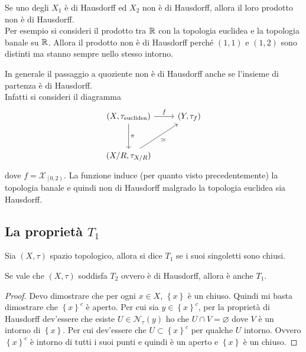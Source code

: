 \begin{remark}
Se uno degli $X_1$ è di Hausdorff ed $X_2$ non è di Hausdorff, allora il loro prodotto non è di Hausdorff. \\ Per esempio si consideri il prodotto tra $\mathbb{R}$ con la topologia euclidea e la topologia banale su $\mathbb{R}$. Allora il prodotto non è di Hausdorff perché $(1,1)$ e $(1,2)$ sono distinti ma stanno sempre nello stesso intorno. 
	
\end{remark} 


\begin{remark}
	In generale il passaggio a quoziente non è di Hausdorff anche se l'insieme di partenza è di Hausdorff. \\ Infatti si consideri il diagramma 
	\begin{equation*}
	\begin{tikzcd}[row sep = 3em]
	 (X, \tau_{\text{euclidea}}) \arrow{d}{\pi}\arrow{r}{f} & (Y, \tau_f)\\
	(X/R,\tau_{X/R}) \arrow[swap]{ru}{\simeq} &
	\end{tikzcd}
	\end{equation*}
	dove $f = \mathcal{X}_{\left[0,2\right)}$. La funzione induce (per quanto visto precedentemente) la topologia banale e quindi non di Hausdorff malgrado la topologia euclidea sia Hausdorff. 
\end{remark} 



\subsection{\textcolor{TopGener}{\textbf{La proprietà $T_1$}}}



\begin{definition}
	Sia $(X, \tau)$ spazio topologico, allora si dice \textbf{$T_1$} se i suoi singoletti sono chiusi. 
\end{definition}

\begin{theorem}
	Se vale che $(X, \tau)$ soddisfa $T_2$ ovvero è di Hausdorff, allora è anche $T_1$.
\end{theorem} 
\begin{proof}
	Devo dimostrare che per ogni $x\in X$, $\left\{x\right\}$ è un chiuso. Quindi mi basta dimostrare che $\left\{x\right\}^c$ è aperto. Per cui sia $y \in \left\{x\right\}^c$, per la proprietà di Hausdorff dev'essere che esiste $U \in \mathcal{N}_\tau(y)$ ho che $U \cap V = \varnothing$ dove $V$ è un intorno di $\left\{x\right\}$. Per cui dev'essere che $U \subset \left\{x\right\}^c$ per qualche $U$ intorno. Ovvero $\left\{x\right\}^c$ è intorno di tutti i suoi punti e quindi è un aperto e $\left\{x\right\}$ è un chiuso.
\end{proof}

